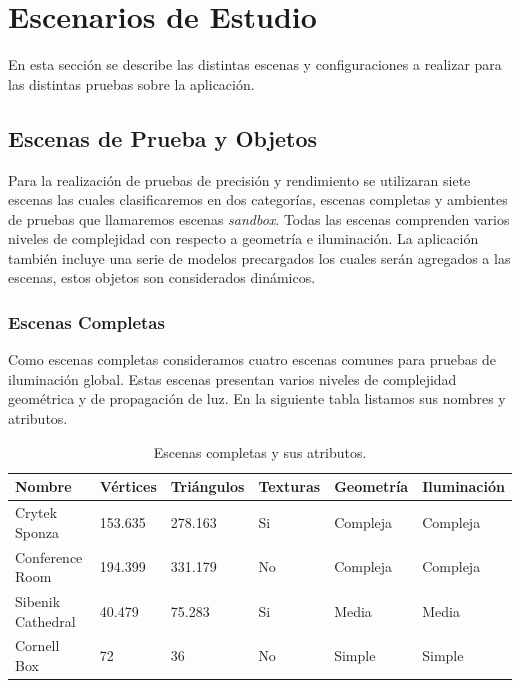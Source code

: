 \section{Escenarios de Estudio}

En esta sección se describe las distintas escenas y configuraciones a realizar para las distintas pruebas sobre la aplicación.

\subsection{Escenas de Prueba y Objetos}

Para la realización de pruebas de precisión y rendimiento se utilizaran siete escenas las cuales clasificaremos en dos categorías, escenas completas y ambientes de pruebas que llamaremos escenas \emph{sandbox}. Todas las escenas comprenden varios niveles de complejidad con respecto a geometría e iluminación. La aplicación también incluye una serie de modelos precargados los cuales serán agregados a las escenas, estos objetos son considerados dinámicos.

\subsubsection{Escenas Completas}

Como escenas completas consideramos cuatro escenas comunes para pruebas de iluminación global. Estas escenas presentan varios niveles de complejidad geométrica y de propagación de luz. En la siguiente tabla listamos sus nombres y atributos.

\begin{table}[h]
\centering
\label{tab:scenes_attributes}
\begin{tabular}{|l|l|l|l|l|l|}
\hline
Nombre            & Vértices & Triángulos & Texturas & Geometría & Iluminación \\ \hline
Crytek Sponza     & 153.635  & 278.163    & Si       & Compleja  & Compleja     \\ \hline
Conference Room   & 194.399  & 331.179    & No       & Compleja  & Compleja     \\ \hline
Sibenik Cathedral & 40.479   & 75.283     & Si       & Media     & Media        \\ \hline
Cornell Box       & 72       & 36         & No       & Simple    & Simple       \\ \hline
\end{tabular}
\caption{Escenas completas y sus atributos.}
\end{table}

